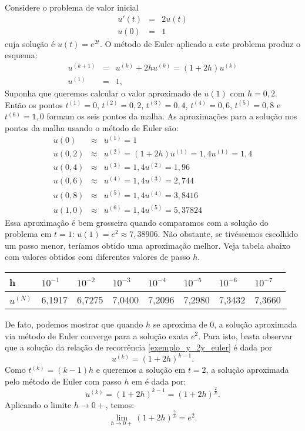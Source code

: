 \begin{ex}
Considere o problema de valor inicial
\begin{eqnarray*}
  u'(t)&=&2u(t)\\
  u(0)&=&1
\end{eqnarray*}
cuja solução é $u(t)=e^{2t}$. O método de Euler aplicado a este problema produz o  esquema:
\begin{eqnarray}\label{exemplo_y_2y_euler}
  u^{(k+1)}&=&u^{(k)}+2hu^{(k)}=(1+2h)u^{(k)}\\
  u^{(1)}&=&1,
\end{eqnarray}
Suponha que queremos calcular o valor aproximado de $u(1)$ com $h=0,2$. Então os pontos $t^{(1)}=0$, $t^{(2)}=0,2$, $t^{(3)}=0,4$, $t^{(4)}=0,6$, $t^{(5)}=0,8$ e $t^{(6)}=1,0$ formam os seis pontos da malha. As aproximações para a solução nos pontos da malha usando o método de Euler são:
\begin{eqnarray*}
  u(0)  &\approx &u^{(1)}=1\\
  u(0,2)&\approx &u^{(2)}=(1+2h) u^{(1)}=1,4 u^{(1)}=1,4\\
  u(0,4)&\approx &u^{(3)}=1,4 u^{(2)}=1,96\\
  u(0,6)&\approx &u^{(4)}=1,4 u^{(3)}=2,744\\
  u(0,8)&\approx &u^{(5)}=1,4 u^{(4)}=3,8416\\
  u(1,0)&\approx &u^{(6)}=1,4 u^{(5)}=5,37824
\end{eqnarray*}
Essa aproximação é bem grosseira quando comparamos com a solução do problema em $t=1$: $u(1)=e^{2}\approx 7,38906$. Não obstante, se tivéssemos escolhido um passo menor, teríamos obtido uma aproximação melhor. Veja tabela abaixo com valores obtidos com diferentes valores de passo $h$.

\begin{tabular}{|l|l|l|l|l|l|l|l|}%
\hline
   h&$10^{-1}$&$10^{-2}$&$10^{-3}$&$10^{-4}$&$10^{-5}$&$10^{-6}$&$10^{-7}$\\
   \hline
   $u^{(N)}$& 6,1917 &  6,7275 &  7,0400 &  7,2096  & 7,2980 &  7,3432  & 7,3660\\
   \hline
  \end{tabular}
 
De fato, podemos mostrar que quando $h$ se aproxima de $0$, a solução aproximada via método de Euler converge para a solução exata $e^2$. Para isto, basta observar que a solução da relação de recorrência \eqref{exemplo_y_2y_euler} é dada por
 $$u^{(k)}=(1+2h)^{k-1}.$$
 Como $t^{(k)}=(k-1)h$ e queremos a solução em $t=2$, a solução aproximada pelo método de Euler com passo $h$ em é dada por:
 $$u^{(k)}= (1+2h)^{k-1}= (1+2h)^{\frac{2}{h}}.$$
Aplicando o limite $h\to 0+$, temos:
  $$\lim_{h\to 0+} (1+2h)^{\frac{2}{h}}= e^{2}.$$


\end{ex}
